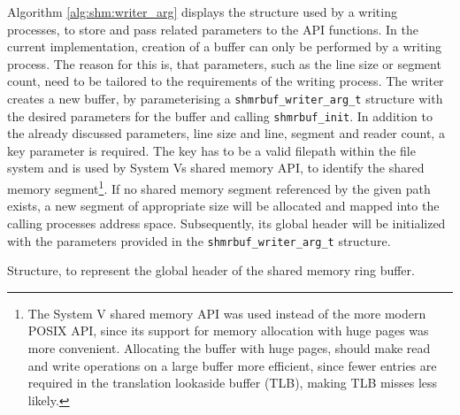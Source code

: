 Algorithm \ref{alg:shm:writer_arg} displays the structure used by a writing processes, to store and pass related parameters to the API functions.
In the current implementation, creation of a buffer can only be performed by a writing process. The reason for this is, that parameters, such as the line
size or segment count, need to be tailored to the requirements of the writing process. The writer creates a new buffer, by parameterising a \texttt{shmrbuf\_writer\_arg\_t} structure with
the desired parameters for the buffer and calling \texttt{shmrbuf\_init}. In addition to the already discussed parameters, line size and line, segment and reader count, 
a key parameter is required. The key has to be a valid filepath within the file system and is used by System Vs shared memory API, to identify the shared memory segment\footnote{The System V shared memory API \cite{systemvshm} was used instead of the more modern POSIX API, since its support for memory allocation with huge pages was more convenient. Allocating the buffer with huge pages, should make read and write operations on a large buffer more efficient, since fewer entries are required in the translation lookaside buffer (TLB), making TLB misses less likely.}.  
If no shared memory segment referenced by the given path exists, a new segment of appropriate size will be allocated and mapped into the calling processes address space. Subsequently, its global header will 
be initialized with the parameters provided in the \texttt{shmrbuf\_writer\_arg\_t} structure.  

\begin{algorithm}[h!]
    
    \caption[Shared Memory Ringbuffer: Global Header]{Structure, to represent the global header of the shared memory ring buffer.}
    \label{alg:shm:global_hdr}
\end{algorithm}

